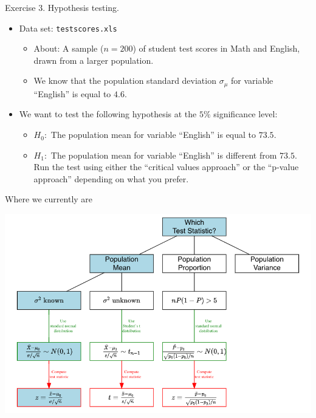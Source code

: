 \documentclass[
  10pt,
  ignorenonframetext,
]{beamer}
\providecommand{\tightlist}{%
  \setlength{\itemsep}{0pt}\setlength{\parskip}{0pt}}
\begin{document}
\begin{frame}{Exercise 3. Hypothesis testing.}
\begin{itemize}
\tightlist
\item
  Data set: \texttt{testscores.xls}

  \begin{itemize}
  \tightlist
  \item
    About: A sample (\(n=200\)) of student test scores in Math and
    English, drawn from a larger population.
  \item
    We know that the population standard deviation \(\sigma_\mu\) for
    variable ``English'' is equal to \(4.6\).
  \end{itemize}
\end{itemize}

\vspace{3mm}

\begin{itemize}
\tightlist
\item
  We want to test the following hypothesis at the \(5\%\) significance
  level:

  \begin{itemize}
  \tightlist
  \item
    \(H_0:\) The population mean for variable ``English'' is equal to
    \(73.5\).
  \item
    \(H_1:\) The population mean for variable ``English'' is different
    from \(73.5\). Run the test using either the ``critical values
    approach'' or the ``p-value approach'' depending on what you prefer.
  \end{itemize}
\end{itemize}
\end{frame}

\begin{frame}{Where we currently are}
\protect\hypertarget{where-we-currently-are-3}{}
\begin{center}\includegraphics[width=0.9\linewidth]{pictures/HypothesisTestsGuide-Case1} \end{center}
\end{frame}
\end{document}
